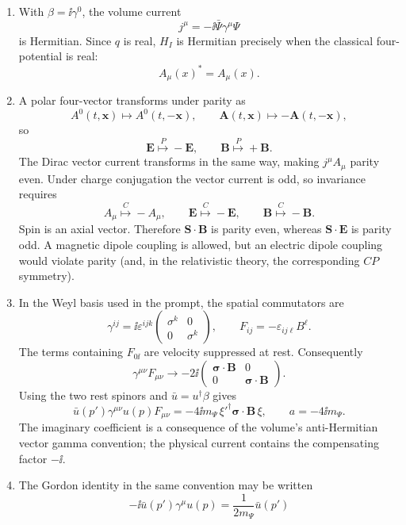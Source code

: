 \begin{enumerate}
\begin{enumerate}
\item
With \(\beta=\ii\gamma^0\), the volume current
\[
 j^\mu=-\ii\bar\Psi\gamma^\mu\Psi
\]
is Hermitian.  Since \(q\) is real, \(H_I\) is Hermitian precisely when
the classical four-potential is real:
\[
 \boxed{A_\mu(x)^*=A_\mu(x).}
\]
\item
A polar four-vector transforms under parity as
\[
 A^0(t,\mathbf x)\longmapsto A^0(t,-\mathbf x),
 \qquad
 \mathbf A(t,\mathbf x)\longmapsto-\mathbf A(t,-\mathbf x),
\]
so
\[
 \mathbf E\overset{P}{\longmapsto}-\mathbf E,\qquad
 \mathbf B\overset{P}{\longmapsto}+\mathbf B.
\]
The Dirac vector current transforms in the same way, making
\(j^\mu A_\mu\) parity even.  Under charge conjugation the vector
current is odd, so invariance requires
\[
 A_\mu\overset{C}{\longmapsto}-A_\mu,
 \qquad
 \mathbf E\overset{C}{\longmapsto}-\mathbf E,\qquad
 \mathbf B\overset{C}{\longmapsto}-\mathbf B.
\]
Spin is an axial vector.  Therefore
\(\mathbf S\cdot\mathbf B\) is parity even, whereas
\(\mathbf S\cdot\mathbf E\) is parity odd.  A magnetic dipole coupling
is allowed, but an electric dipole coupling would violate parity
(and, in the relativistic theory, the corresponding \(CP\) symmetry).
\item
In the Weyl basis used in the prompt, the spatial commutators are
\[
 \gamma^{ij}
 =\ii\varepsilon^{ijk}
 \begin{pmatrix}\sigma^k&0\\0&\sigma^k\end{pmatrix},
 \qquad
 F_{ij}=-\varepsilon_{ij\ell}B^\ell.
\]
The terms containing \(F_{0\ii}\) are velocity suppressed at rest.
Consequently
\[
 \gamma^{\mu\nu}F_{\mu\nu}
 \longrightarrow
 -2\ii
 \begin{pmatrix}
 \boldsymbol\sigma\cdot\mathbf B&0\\
 0&\boldsymbol\sigma\cdot\mathbf B
 \end{pmatrix}.
\]
Using the two rest spinors and
\(\bar u=u^\dagger\beta\) gives
\[
 \boxed{
 \bar u(p')\gamma^{\mu\nu}u(p)F_{\mu\nu}
 =-4\ii m_\Psi\,
 \xi'^\dagger\boldsymbol\sigma\cdot\mathbf B\,\xi,
 \qquad a=-4\ii m_\Psi.}
\]
The imaginary coefficient is a consequence of the volume's
anti-Hermitian vector gamma convention; the physical current contains
the compensating factor \(-\ii\).
\item
The Gordon identity in the same convention may be written
\[
 -\ii\bar u(p')\gamma^\mu u(p)
 =\frac{1}{2m_\Psi}\bar u(p')
\]
\end{enumerate}
\end{enumerate}
